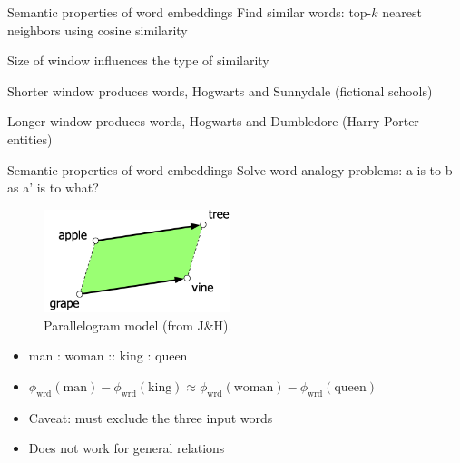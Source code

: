 \documentclass[usenames,dvipsnames,notes,11pt,aspectratio=169]{beamer}
\newcommand{\pdfnote}[1]{}
\begin{document}
\begin{frame}
    {Semantic properties of word embeddings}
        Find similar words: top-$k$ nearest neighbors using cosine similarity
            \begin{wideitemize}
                \item Size of window influences the type of similarity
                \item Shorter window produces  words, \eg Hogwarts and Sunnydale (fictional schools)
                \item Longer window produces  words, \eg Hogwarts and Dumbledore (Harry Porter entities)
            \end{wideitemize}
\end{frame}

\begin{frame}
    {Semantic properties of word embeddings}
        Solve word analogy problems: a is to b as a' is to what?
        \vspace{-1em}
        \begin{figure}
            \includegraphics[height=3cm]{figures/analogy}
            \caption{Parallelogram model (from J\&H).}
        \end{figure}
        \vspace{-1em}
            \begin{itemize}
                \item man : woman :: king : queen
                \item[] $\phi_{\text{wrd}}(\text{man}) - \phi_{\text{wrd}}(\text{king}) \approx \phi_{\text{wrd}}(\text{woman}) - \phi_{\text{wrd}}(\text{queen})$
                \item Caveat: must exclude the three input words
                \item Does not work for general relations
            \end{itemize}
            \pdfnote{
                While embedding spaces perform well if the task involves frequent words, small distances, and certain relations (like relating countries with their capitals or verbs/nouns with their inflected forms), the parallelogram method with embeddings doesn’t work as well for other relations
            }
\end{frame}
\end{document}
